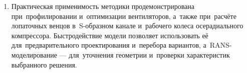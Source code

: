\begin{enumerate}
	\item Практическая применимость методики продемонстрирована при~профилировании и~оптимизации вентиляторов, а~также при~расчёте лопаточных венцов в~S-образном канале и~рабочего колеса осерадиального компрессора. Быстродействие модели позволяет использовать её для~предварительного проектирования и~перебора вариантов, а~RANS-моделирование — для~уточнения геометрии и~проверки характеристик выбранного решения.
\end{enumerate}
